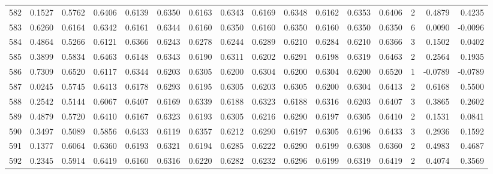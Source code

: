 \begin{tabular}{lrrrrrrrrrrrrrrr}
582 &      0.1527 &  0.5762 &  0.6406 &  0.6139 &  0.6350 &  0.6163 &  0.6343 &  0.6169 &  0.6348 &  0.6162 &   0.6353 &     0.6406 &      2 &                    0.4879 &                     0.4235 \\
583 &      0.6260 &  0.6164 &  0.6342 &  0.6161 &  0.6344 &  0.6160 &  0.6350 &  0.6160 &  0.6350 &  0.6160 &   0.6350 &     0.6350 &      6 &                    0.0090 &                    -0.0096 \\
584 &      0.4864 &  0.5266 &  0.6121 &  0.6366 &  0.6243 &  0.6278 &  0.6244 &  0.6289 &  0.6210 &  0.6284 &   0.6210 &     0.6366 &      3 &                    0.1502 &                     0.0402 \\
585 &      0.3899 &  0.5834 &  0.6463 &  0.6148 &  0.6343 &  0.6190 &  0.6311 &  0.6202 &  0.6291 &  0.6198 &   0.6319 &     0.6463 &      2 &                    0.2564 &                     0.1935 \\
586 &      0.7309 &  0.6520 &  0.6117 &  0.6344 &  0.6203 &  0.6305 &  0.6200 &  0.6304 &  0.6200 &  0.6304 &   0.6200 &     0.6520 &      1 &                   -0.0789 &                    -0.0789 \\
587 &      0.0245 &  0.5745 &  0.6413 &  0.6178 &  0.6293 &  0.6195 &  0.6305 &  0.6203 &  0.6305 &  0.6200 &   0.6304 &     0.6413 &      2 &                    0.6168 &                     0.5500 \\
588 &      0.2542 &  0.5144 &  0.6067 &  0.6407 &  0.6169 &  0.6339 &  0.6188 &  0.6323 &  0.6188 &  0.6316 &   0.6203 &     0.6407 &      3 &                    0.3865 &                     0.2602 \\
589 &      0.4879 &  0.5720 &  0.6410 &  0.6167 &  0.6323 &  0.6193 &  0.6305 &  0.6216 &  0.6290 &  0.6197 &   0.6305 &     0.6410 &      2 &                    0.1531 &                     0.0841 \\
590 &      0.3497 &  0.5089 &  0.5856 &  0.6433 &  0.6119 &  0.6357 &  0.6212 &  0.6290 &  0.6197 &  0.6305 &   0.6196 &     0.6433 &      3 &                    0.2936 &                     0.1592 \\
591 &      0.1377 &  0.6064 &  0.6360 &  0.6193 &  0.6321 &  0.6194 &  0.6285 &  0.6222 &  0.6290 &  0.6199 &   0.6308 &     0.6360 &      2 &                    0.4983 &                     0.4687 \\
592 &      0.2345 &  0.5914 &  0.6419 &  0.6160 &  0.6316 &  0.6220 &  0.6282 &  0.6232 &  0.6296 &  0.6199 &   0.6319 &     0.6419 &      2 &                    0.4074 &                     0.3569 \\

\end{tabular}
